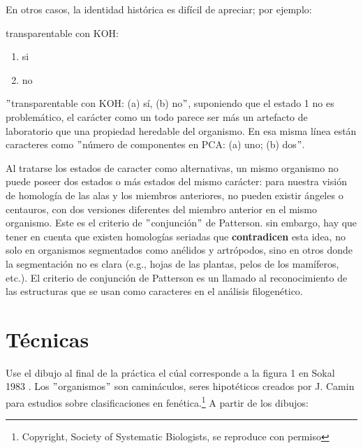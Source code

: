 En otros casos, la identidad hist\'orica es dif\'icil de apreciar; por ejemplo:

\begin{small}
transparentable con KOH: 
	\begin{enumerate}[start=0]
		\item si
		\item no
	\end{enumerate}	
\end{small}

$"$transparentable con KOH: (a) s\'i, (b) no$"$, suponiendo que el estado 1 no es problem\'atico, el car\'acter como un todo parece ser m\'as un artefacto de laboratorio que una propiedad heredable del organismo. En esa misma l\'inea est\'an caracteres como $"$n\'umero de componentes en PCA: (a) uno; (b) dos$"$.

Al tratarse los estados de caracter como alternativas, un mismo organismo no puede poseer dos estados o m\'as estados del mismo car\'acter: para nuestra visi\'on de homolog\'ia de las alas y los miembros anteriores, no pueden existir \'angeles o centauros, con dos versiones diferentes del miembro anterior en el mismo organismo. Este es el criterio de $"$conjunci\'on$"$ de Patterson. sin embargo, hay que tener en cuenta que existen homolog\'ias seriadas que \textbf{contradicen} esta idea, no solo en organismos segmentados como an\'elidos y artr\'opodos, sino en otros donde la segmentaci\'on no es clara (e.g., hojas de las plantas, pelos de los mam\'iferos, etc.). El criterio de conjunci\'on de Patterson es un llamado al reconocimiento de las estructuras que se usan como caracteres en el an\'alisis filogen\'etico.


\section*{T\'ecnicas}


Use el dibujo al final de la pr\'actica el c\'ual corresponde a la figura 1 en Sokal 1983 \cite{Sokal1983}. 
Los $"$organismos$"$ son camin\'aculos, seres hipot\'eticos creados por J. Camin para estudios sobre clasificaciones en fen\'etica.\footnote{Copyright, Society of Systematic Biologists, se reproduce con permiso} A partir de los dibujos:



